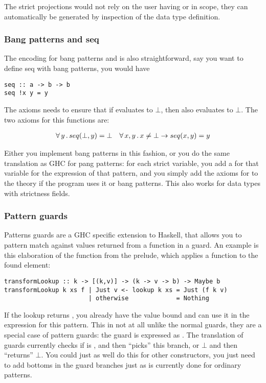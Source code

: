 The strict projections would not rely on the user having  or
 in scope, they can automatically be generated by
inspection of the data type definition.

\subsubsection{Bang patterns and seq}

The encoding for bang patterns and  is also straightforward,
say you want to define seq with bang patterns, you would have

\begin{verbatim}
seq :: a -> b -> b
seq !x y = y
\end{verbatim}

The axioms needs to ensure that if  evaluates to $\bot$, then
 also evaluates to $\bot$. The two axioms for this functions are:

\begin{align*}
\forall \, y \, . \,    & seq(\bot,y) = \bot
& \forall \, x , y \, . \, x \neq \bot \rightarrow seq(x,y) = y
\end{align*}

Either you implement bang patterns in this fashion, or you do the same
translation as GHC for pang patterns: for each strict variable, you
add a  for that variable for the expression of that pattern,
and you simply add the axioms for  to the theory if the
program uses it or bang patterns. This also works for data types with
strictness fields.

\subsubsection{Pattern guards}

Patterns guards are a GHC specific extension to Haskell, that allows
you to pattern match against values returned from a function in a
guard. An example is this elaboration of the  function from
the prelude, which applies a function to the found element:

\begin{verbatim}
transformLookup :: k -> [(k,v)] -> (k -> v -> b) -> Maybe b
transformLookup k xs f | Just v <- lookup k xs = Just (f k v)
                       | otherwise             = Nothing
\end{verbatim}

If the lookup returns , you already have the value 
bound and can use it in the expression for this pattern. This in not
at all unlike the normal guards, they are a special case of pattern
guards: the guard  is expressed as
. The translation of guards currently checks if
 is , and then ``picks'' this branch, or $\bot$ and
then ``returns'' $\bot$. You could just as well do this for other
constructors, you just need to add bottoms in the guard branches just
as is currently done for ordinary patterns.

